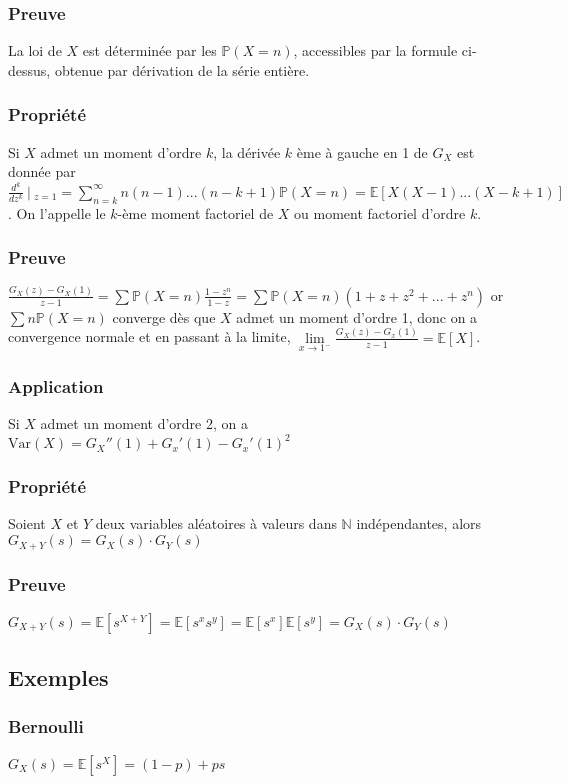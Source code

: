 \documentclass[a4paper,10pt]{book} %
\newcommand{\N}{\mathbb{N}}
\newcommand{\E}{\mathbb{E}} %
\renewcommand{\P}{\mathbb{P}} %
\newcommand{\tq}{~|~}
\newcommand{\Var}{\mathrm{Var}} %
\begin{document}
\subsubsection{Preuve}
La loi de $X$ est déterminée par les $\P(X=n)$, accessibles par la formule ci-dessus, obtenue par dérivation de la série entière.

\subsubsection{Propriété}
Si $X$ admet un moment d'ordre $k$, la dérivée $k$ ème à gauche en 1 de $G_X$ est donnée par $\displaystyle \frac{d^k}{dz^k}\tq_{z=1}=\sum_{n=k}^\infty n(n-1)...(n-k+1)\P(X=n)=\E[X(X-1)...(X-k+1)]$. On l'appelle le $k$-ème moment factoriel de $X$ ou moment factoriel d'ordre $k$.

\subsubsection{Preuve}
$\displaystyle \frac{G_X(z)-G_X(1)}{z-1}=\sum \P(X=n)\frac{1-z^n}{1-z}=\sum \P(X=n)(1+z+z^2+...+z^n)$ or $\sum n \P(X=n)$ converge dès que $X$ admet un moment d'ordre 1, donc on a convergence normale et en passant à la limite, $\lim\limits_{x\rightarrow 1^-}\frac{G_X(z)-G_x(1)}{z-1}=\E[X]$.

\subsubsection{Application}
Si $X$ admet un moment d'ordre 2, on a $\Var(X)=G_X''(1)+G_x'(1)-G_x'(1)^2$

\subsubsection{Propriété}
Soient $X$ et $Y$ deux variables aléatoires à valeurs dans $\N$ indépendantes, alors $G_{X+Y}(s)=G_X(s)\cdot G_Y(s)$

\subsubsection{Preuve}
$G_{X+Y}(s)=\E[s^{X+Y}]=\E[s^xs^y]=\E[s^x]\E[s^y]=G_X(s)\cdot G_Y(s)$

\subsection{Exemples}
\subsubsection{Bernoulli}
$G_X(s)=\E[s^X]=(1-p)+ps$
\end{document}
